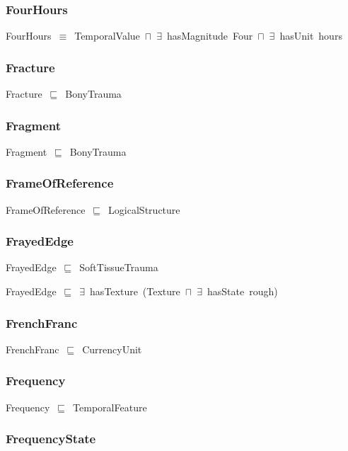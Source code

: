 \documentclass{article}
\begin{document}
\subsubsection*{FourHours}

FourHours~\ensuremath{\equiv}~TemporalValue~\ensuremath{\sqcap}~\ensuremath{\exists}~hasMagnitude~Four~\ensuremath{\sqcap}~\ensuremath{\exists}~hasUnit~hours

\subsubsection*{Fracture}

Fracture~\ensuremath{\sqsubseteq}~BonyTrauma~

\subsubsection*{Fragment}

Fragment~\ensuremath{\sqsubseteq}~BonyTrauma~

\subsubsection*{FrameOfReference}

FrameOfReference~\ensuremath{\sqsubseteq}~LogicalStructure~

\subsubsection*{FrayedEdge}

FrayedEdge~\ensuremath{\sqsubseteq}~SoftTissueTrauma~

FrayedEdge~\ensuremath{\sqsubseteq}~\ensuremath{\exists}~hasTexture~(Texture~\ensuremath{\sqcap}~\ensuremath{\exists}~hasState~rough)~

\subsubsection*{FrenchFranc}

FrenchFranc~\ensuremath{\sqsubseteq}~CurrencyUnit~

\subsubsection*{Frequency}

Frequency~\ensuremath{\sqsubseteq}~TemporalFeature~

\subsubsection*{FrequencyState}
\end{document}
